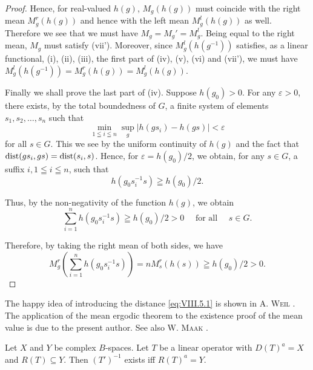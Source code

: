 \begin{proof}
Hence, for real-valued $h(g)$, $M_g(h(g))$ must coincide with the right mean $M_g^r(h(g))$ and hence with the left mean $M_g^l(h(g))$ as well. Therefore we see that we must have $M_g = M_g' = M_g^l$. Being equal to the right mean, $M_g$ must satisfy (vii'). Moreover, since $M_g^l(h(g^{-1}))$ satisfies, as a linear functional, (i), (ii), (iii), the first part of (iv), (v), (vi) and (vii'), we must have $M_g^l(h(g^{-1})) = M_g^r(h(g)) = M_g^l(h(g))$.

Finally we shall prove the last part of (iv). Suppose $h(g_{0}) > 0$. For any $\varepsilon > 0$, there exists, by the total boundedness of $G$, a finite system of elements $s_{1}, s_{2}, \ldots, s_{n}$ such that 
\[
\min\limits _{1 \leqq i \leqq n} \sup\limits _{g} | h (g s _{i}) - h (g s) | < \varepsilon
\]
for all $s \in G$. This we see by the uniform continuity of $h(g)$ and the fact that $\operatorname{dist}(gs_i, gs) = \operatorname{dist}(s_i, s)$. Hence, for $\varepsilon = h(g_0)/2$, we obtain, for any $s \in G$, a suffix $i, 1 \leqq i \leqq n$, such that 
\[
h \left(g _{0} s _{i} ^{-1} s\right) \geqq h \left(g _{0}\right) / 2.
\]

Thus, by the non-negativity of the function $h(g)$, we obtain 
\[
\sum\limits_{i=1} ^{n} h \left(g _{0} s _{i} ^{-1} s\right) \geqq h \left(g _{0}\right) / 2 > 0 \quad \text{ for all } \quad s \in G.
\]

Therefore, by taking the right mean of both sides, we have 
\[
M _{g} ^{r} \left(\sum\limits_{i=1} ^{n} h \left(g _{0} s _{i} ^{-1} s\right)\right) = n M _{s} ^{r} (h (s)) \geqq h \left(g _{0}\right) / 2 > 0.
\]
\end{proof}

\begin{remarku} The happy idea of introducing the distance \eqref{eq:VIII.5.1} is shown in A. \textsc{Weil} \cite{weil334}. The application of the mean ergodic theorem to the existence proof of the mean value is due to the present author. See also W. \textsc{Maak} \cite{lumer185}. 
\end{remarku}


\label{sec:VIII.6}

\begin{lemma}\label{lem:VIII.6.Lemma.1} Let $X$ and $Y$ be complex $B$-spaces. Let $T$ be a linear operator with $D(T)^a = X$ and $R(T) \subseteq Y$. Then $(T')^{-1}$ exists iff $R(T)^a = Y$.
\end{lemma}

